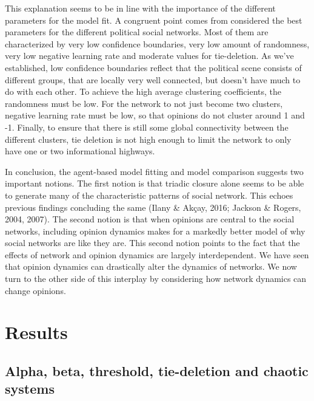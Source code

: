 \documentclass{article}
\begin{document}
This explanation seems to be in line with the importance of the different parameters for the model fit. A congruent point comes from considered the best parameters for the different political social networks. Most of them are characterized by very low confidence boundaries, very low amount of randomness, very low negative learning rate and moderate values for tie-deletion. As we’ve established, low confidence boundaries reflect that the political scene consists of different groups, that are locally very well connected, but doesn’t have much to do with each other. To achieve the high average clustering coefficients, the randomness must be low. For the network to not just become two clusters, negative learning rate must be low, so that opinions do not cluster around 1 and -1. Finally, to ensure that there is still some global connectivity between the different clusters, tie deletion is not high enough to limit the network to only have one or two informational highways. 

In conclusion, the agent-based model fitting and model comparison suggests two important notions. The first notion is that triadic closure alone seems to be able to generate many of the characteristic patterns of social network. This echoes previous findings concluding the same (Ilany \& Akçay, 2016; Jackson \& Rogers, 2004, 2007). The second notion is that when opinions are central to the social networks, including opinion dynamics makes for a markedly better model of why social networks are like they are. 
This second notion points to the fact that the effects of network and opinion dynamics are largely interdependent. We have seen that opinion dynamics can drastically alter the dynamics of networks. We now turn to the other side of this interplay by considering how network dynamics can change opinions.

\section{Results}

\subsection{Alpha, beta, threshold, tie-deletion and chaotic systems}
\end{document}
